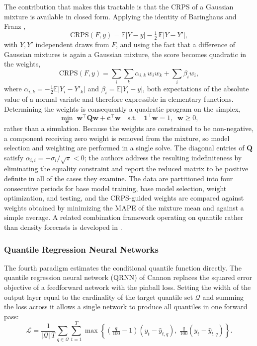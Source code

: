 \documentclass[10pt,journal,compsoc]{IEEEtran}
\begin{document}
The contribution that makes this tractable is that the CRPS of a Gaussian mixture is
available in closed form. Applying the identity of Baringhaus and Franz
\cite{baringhaus2004new},
\begin{equation}
\mathrm{CRPS}(F, y) = \mathbb{E}\left|Y - y\right|
                    - \tfrac{1}{2}\,\mathbb{E}\left|Y - Y'\right|,
\end{equation}
with $Y, Y'$ independent draws from $F$, and using the fact that a difference of Gaussian
mixtures is again a Gaussian mixture, the score becomes quadratic in the weights,
\begin{equation}
\mathrm{CRPS}(F, y) = \sum_i \sum_k \alpha_{i,k}\, w_i w_k + \sum_i \beta_i w_i ,
\end{equation}
where $\alpha_{i,k} = -\tfrac{1}{2}\mathbb{E}|Y_i - Y'_k|$ and
$\beta_i = \mathbb{E}|Y_i - y|$, both expectations of the absolute value of a normal variate
and therefore expressible in elementary functions. Determining the weights is consequently a
quadratic program on the simplex,
\begin{equation}
\min_{\mathbf{w}} \; \mathbf{w}^{\top}\mathbf{Q}\mathbf{w} + \mathbf{c}^{\top}\mathbf{w}
\quad \text{s.t.} \quad \mathbf{1}^{\top}\mathbf{w} = 1, \;\; \mathbf{w} \ge 0,
\end{equation}
rather than a simulation. Because the weights are constrained to be non-negative, a component
receiving zero weight is removed from the mixture, so model selection and weighting are
performed in a single solve. The diagonal entries of $\mathbf{Q}$ satisfy
$\alpha_{i,i} = -\sigma_i/\sqrt{\pi} < 0$; the authors address the resulting indefiniteness by
eliminating the equality constraint and report the reduced matrix to be positive definite in
all of the cases they examine. The data are partitioned into four consecutive periods for
base model training, base model selection, weight optimization, and testing, and the
CRPS-guided weights are compared against weights obtained by minimizing the MAPE of the
mixture mean and against a simple average. A related combination framework operating on
quantile rather than density forecasts is developed in \cite{wang2019combining}.

\subsubsection{Quantile Regression Neural Networks}
The fourth paradigm estimates the conditional quantile function directly. The quantile
regression neural network (QRNN) of Cannon \cite{cannon2011quantile} replaces the squared
error objective of a feedforward network with the pinball loss. Setting the width of the
output layer equal to the cardinality of the target quantile set $\mathcal{Q}$ and summing the
loss across it allows a single network to produce all quantiles in one forward pass:
\begin{equation}
\mathcal{L} = \frac{1}{|\mathcal{Q}|\,T}
  \sum_{q \in \mathcal{Q}} \sum_{t=1}^{T}
  \max\!\left\{\left(\tfrac{q}{100}-1\right)\left(y_t - \hat{y}_{t,q}\right),\;
               \tfrac{q}{100}\left(y_t - \hat{y}_{t,q}\right)\right\}.
\end{equation}
\end{document}
